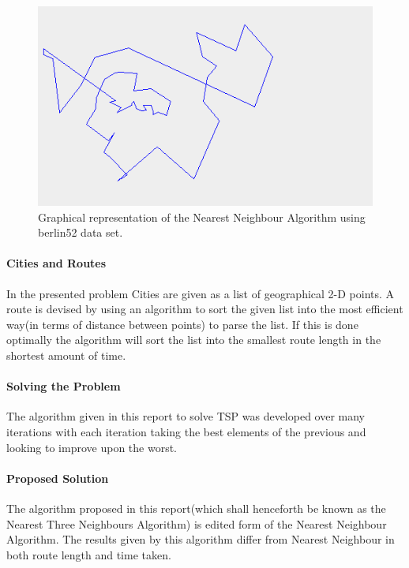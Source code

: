 \documentclass[conference,backref=page]{acmsiggraph}
\begin{document}
\begin{figure}[h]
	\centering
	\includegraphics[width=1.0\columnwidth]{images/nearestNeighbourPath}
	\caption{Graphical representation of the Nearest Neighbour Algorithm using berlin52 data set.}
\end{figure}
    
\paragraph{Cities and Routes}
In the presented problem Cities are given as a list of geographical 2-D points. A route is devised by using an algorithm to sort the given list into the most efficient way(in terms of distance between points) to parse the list. If this is done optimally the algorithm will sort the list into the smallest route length in the shortest amount of time.

\paragraph{Solving the Problem}
The algorithm given in this report to solve TSP was developed over many iterations with each iteration taking the best elements of the previous and looking to improve upon the worst.

\paragraph{Proposed Solution}
The algorithm proposed in this report(which shall henceforth be known as the Nearest Three Neighbours Algorithm) is edited form of the Nearest Neighbour Algorithm. The results given by this algorithm differ from Nearest Neighbour in both route length and time taken.
\end{document}
